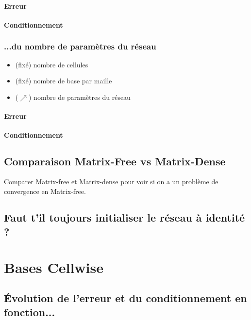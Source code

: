 \documentclass[12pt,a4paper]{article}
\let\oldparagraph\paragraph
\renewcommand{\paragraph}[1]{\oldparagraph{#1}\leavevmode}
\begin{document}
\paragraph{Erreur}

\paragraph{Conditionnement}

\subsubsection{...du nombre de paramètres du réseau}

\begin{itemize}
    \item (fixé) nombre de cellules
    \item (fixé) nombre de base par maille
    \item ($\nearrow$) nombre de paramètres du réseau
\end{itemize}

\paragraph{Erreur}

\paragraph{Conditionnement}

\subsection{Comparaison Matrix-Free vs Matrix-Dense}

Comparer Matrix-free et Matrix-dense pour voir si on a un problème de convergence en Matrix-free.

\subsection{Faut t'il toujours initialiser le réseau à identité ?}

\newpage
\section{Bases Cellwise}

\subsection{Évolution de l'erreur et du conditionnement en fonction...}
\end{document}
